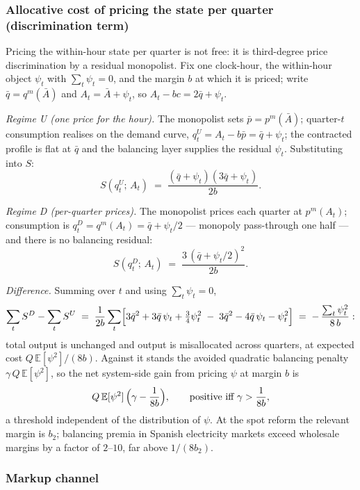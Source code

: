 \documentclass[11pt,a4paper]{article}
\theoremstyle{definition}
\theoremstyle{remark}
\theoremstyle{plain}
\begin{document}
\subsubsection{Allocative cost of pricing the state per quarter (discrimination term)}\label{app:welfare:discrimination}

Pricing the within-hour state per quarter is not free: it is third-degree price discrimination by a residual monopolist. Fix one clock-hour, the within-hour object $\psi_t$ with $\sum_t \psi_t = 0$, and the margin $b$ at which it is priced; write $\bar q = q^m(\bar A)$ and $A_t = \bar A + \psi_t$, so $A_t - bc = 2\bar q + \psi_t$.

\emph{Regime U (one price for the hour).} The monopolist sets $\bar p = p^m(\bar A)$; quarter-$t$ consumption realises on the demand curve, $q_t^U = A_t - b\bar p = \bar q + \psi_t$; the contracted profile is flat at $\bar q$ and the balancing layer supplies the residual $\psi_t$. Substituting into $S$:
\[
S(q_t^U;\, A_t) \;=\; \frac{(\bar q + \psi_t)(3\bar q + \psi_t)}{2 b}.
\]

\emph{Regime D (per-quarter prices).} The monopolist prices each quarter at $p^m(A_t)$; consumption is $q_t^D = q^m(A_t) = \bar q + \psi_t/2$ --- monopoly pass-through one half --- and there is no balancing residual:
\[
S(q_t^D;\, A_t) \;=\; \frac{3\,(\bar q + \psi_t/2)^2}{2 b}.
\]

\emph{Difference.} Summing over $t$ and using $\sum_t \psi_t = 0$,
\[
\sum_t S^D - \sum_t S^U
\;=\; \frac{1}{2 b}\sum_t \Bigl[3\bar q^2 + 3\bar q\,\psi_t + \tfrac{3}{4}\psi_t^2 \;-\; 3\bar q^2 - 4\bar q\,\psi_t - \psi_t^2\Bigr]
\;=\; -\,\frac{\sum_t \psi_t^2}{8\, b}:
\]
total output is unchanged and output is misallocated across quarters, at expected cost $Q\,\mathbb{E}[\psi^2]/(8 b)$. Against it stands the avoided quadratic balancing penalty $\gamma\, Q\, \mathbb{E}[\psi^2]$, so the net system-side gain from pricing $\psi$ at margin $b$ is
\[
Q\,\mathbb{E}[\psi^2]\,\Bigl(\gamma - \frac{1}{8 b}\Bigr),
\qquad\text{positive iff } \gamma > \frac{1}{8 b},
\]
a threshold independent of the distribution of $\psi$. At the spot reform the relevant margin is $b_2$; balancing premia in Spanish electricity markets exceed wholesale margins by a factor of $2$--$10$, far above $1/(8 b_2)$.

\subsubsection{Markup channel}\label{app:welfare:markup}
\end{document}
